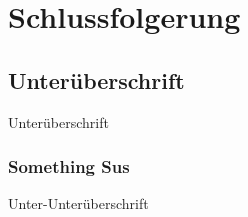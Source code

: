 
\chapter{Schlussfolgerung}\label{ch:schlussfolgerung}

\section{Unterüberschrift}
    Unterüberschrift

    \subsection{Something Sus} %
        Unter-Unterüberschrift
